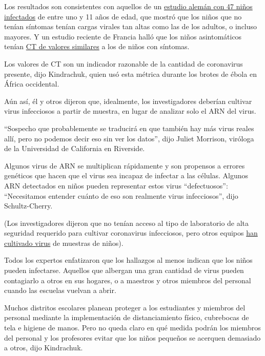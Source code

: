 Los resultados son consistentes con aquellos de un
\href{https://www.nytimes.com/2020/05/05/health/coronavirus-children-transmission-school.html}{estudio
alemán con 47 niños infectados} de entre uno y 11 años de edad, que
mostró que los niños que no tenían síntomas tenían cargas virales tan
altas como las de los adultos, o incluso mayores. Y un estudio reciente
de Francia halló que los niños asintomáticos tenían
\href{https://academic.oup.com/cid/article/doi/10.1093/cid/ciaa1044/5876373}{CT
de valores similares} a los de niños con síntomas.

Los valores de CT son un indicador razonable de la cantidad de
coronavirus presente, dijo Kindrachuk, quien usó esta métrica durante
los brotes de ébola en África occidental.

Aún así, él y otros dijeron que, idealmente, los investigadores deberían
cultivar virus infecciosos a partir de muestra, en lugar de analizar
solo el ARN del virus.

``Sospecho que probablemente se traducirá en que también hay más virus
reales allí, pero no podemos decir eso sin ver los datos'', dijo Juliet
Morrison, viróloga de la Universidad de California en Riverside.

Algunos virus de ARN se multiplican rápidamente y son propensos a
errores genéticos que hacen que el virus sea incapaz de infectar a las
células. Algunos ARN detectados en niños pueden representar estos virus
``defectuosos'': ``Necesitamos entender cuánto de eso son realmente
virus infecciosos'', dijo Schultz-Cherry.

(Los investigadores dijeron que no tenían acceso al tipo de laboratorio
de alta seguridad requerido para cultivar coronavirus infecciosos, pero
otros equipos \href{https://pubmed.ncbi.nlm.nih.gov/32603290/}{han
cultivado virus} de muestras de niños).

Todos los expertos enfatizaron que los hallazgos al menos indican que
los niños pueden infectarse. Aquellos que albergan una gran cantidad de
virus pueden contagiarlo a otros en sus hogares, o a maestros y otros
miembros del personal cuando las escuelas vuelvan a abrir.

Muchos distritos escolares planean proteger a los estudiantes y miembros
del personal mediante la implementación de distanciamiento físico,
cubrebocas de tela e higiene de manos. Pero no queda claro en qué medida
podrán los miembros del personal y los profesores evitar que los niños
pequeños se acerquen demasiado a otros, dijo Kindrachuk.

